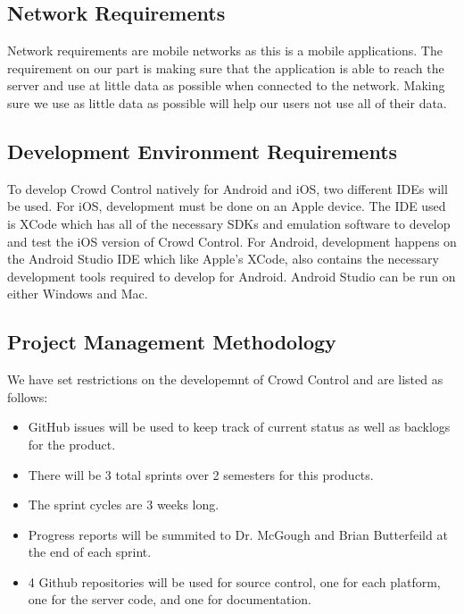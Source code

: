 \subsection{Network Requirements}

Network requirements are mobile networks as this is a mobile applications. The requirement on our part is making sure that the application is able to reach the server and use at little data as possible when connected to the network. Making sure we use as little data as possible will help our users not use all of their data. 

\subsection{Development Environment Requirements}
To develop Crowd Control natively for Android and iOS, two different IDEs will be used.  For iOS, development must be done on an Apple device.  The IDE used is XCode which has all of the necessary SDKs and emulation software to develop and test the iOS version of Crowd Control.  For Android, development happens on the Android Studio IDE which like Apple's XCode, also contains the necessary development tools required to develop for Android.  Android Studio can be run on either  Windows and Mac. 

\subsection{Project  Management Methodology}

We have set restrictions on the developemnt of Crowd Control and are listed as follows:
 
\begin{itemize}
\item GitHub issues will be used to keep track of current status as well as backlogs for the product.
\item There will be 3 total sprints over 2 semesters for this products.
\item The sprint cycles are 3 weeks long.
\item Progress reports will be summited to Dr. McGough and Brian Butterfeild at the end of each sprint.
\item 4 Github repositories will be used for source control, one for each platform, one for the server code, and one for documentation. 
\end{itemize}


